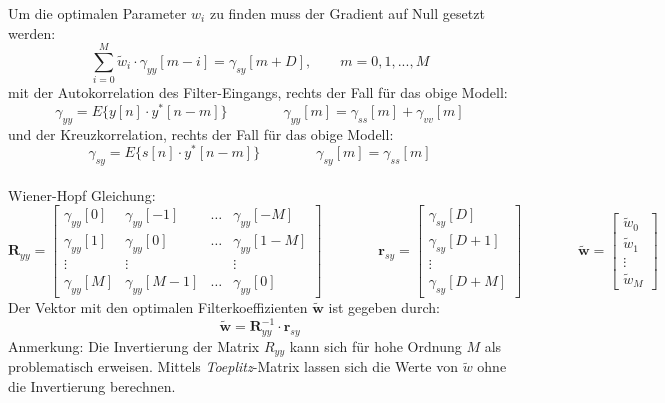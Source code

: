 Um die optimalen Parameter $w_i$ zu finden muss der Gradient auf Null gesetzt 
werden:
\[ \sum_{i=0}^{M}\tilde{w}_i \cdot \gamma_{yy}[m-i] = \gamma_{sy}[m+D], \qquad
	m=0,1,...,M \]
mit der Autokorrelation des Filter-Eingangs, rechts der Fall für das obige Modell:
\[ \gamma_{yy} = E\{ y[n] \cdot y^*[n-m] \} \qquad \qquad \gamma_{yy}[m] = \gamma_{ss}[m] + \gamma_{vv}[m] \]
und der Kreuzkorrelation, rechts der Fall für das obige Modell:
\[ \gamma_{sy} = E \{ s[n] \cdot y^*[n-m] \} \qquad \qquad \gamma_{sy}[m] = \gamma_{ss}[m] \]
~\\
Wiener-Hopf Gleichung:
\[ \textbf{R}_{yy} = \begin{bmatrix}
	\gamma_{yy}[0]	& \gamma_{yy}[-1]	& \ldots	& \gamma_{yy}[-M]\\
	\gamma_{yy}[1]	& \gamma_{yy}[0]	& \ldots	& \gamma_{yy}[1-M]\\
	\vdots			& \vdots			&			& \vdots\\
	\gamma_{yy}[M]	& \gamma_{yy}[M-1]	& \ldots	& \gamma_{yy}[0]
\end{bmatrix} \qquad \qquad
 \textbf{r}_{sy} = \begin{bmatrix}
	\gamma_{sy}[D]\\
	\gamma_{sy}[D+1]\\
	\vdots\\
	\gamma_{sy}[D+M]
\end{bmatrix} \qquad \qquad
  \tilde{\textbf{w}} = \begin{bmatrix}
	\tilde{w}_0\\
	\tilde{w}_1\\
	\vdots\\
	\tilde{w}_M
\end{bmatrix} \]
Der Vektor mit den optimalen Filterkoeffizienten $\tilde{\textbf{w}}$ ist gegeben durch:
\[ \tilde{\textbf{w}} = \textbf{R}_{yy}^{-1} \cdot \textbf{r}_{sy} \]
Anmerkung: Die Invertierung der Matrix $R_{yy}$ kann sich für hohe Ordnung $M$ als 
problematisch erweisen. Mittels \emph{Toeplitz}-Matrix lassen sich die Werte von 
$\tilde{w}$ ohne die Invertierung berechnen. 
